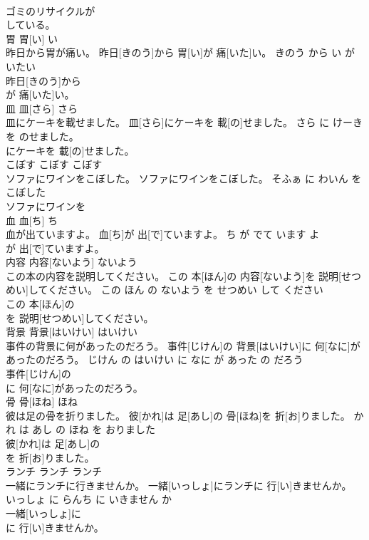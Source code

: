 \documentclass[8pt]{extreport}
\begin{document}
\begin{CJK}{UTF8}{min}
\\	ゴミのリサイクルが
\\	している。		
\\	胃	胃[い]	い	
\\	昨日から胃が痛い。	昨日[きのう]から 胃[い]が 痛[いた]い。	きのう から い が いたい	
\\	昨日[きのう]から
\\	が 痛[いた]い。		
\\	皿	皿[さら]	さら	
\\	皿にケーキを載せました。	皿[さら]にケーキを 載[の]せました。	さら に けーき を のせました。	
\\	にケーキを 載[の]せました。		
\\	こぼす	こぼす	こぼす	
\\	ソファにワインをこぼした。	ソファにワインをこぼした。	そふぁ に わいん を こぼした	
\\	ソファにワインを
\\	血	血[ち]	ち	
\\	血が出ていますよ。	血[ち]が 出[で]ていますよ。	ち が でて います よ	
\\	が 出[で]ていますよ。		
\\	内容	内容[ないよう]	ないよう	
\\	この本の内容を説明してください。	この 本[ほん]の 内容[ないよう]を 説明[せつめい]してください。	この ほん の ないよう を せつめい して ください	
\\	この 本[ほん]の
\\	を 説明[せつめい]してください。		
\\	背景	背景[はいけい]	はいけい	
\\	事件の背景に何があったのだろう。	事件[じけん]の 背景[はいけい]に 何[なに]があったのだろう。	じけん の はいけい に なに が あった の だろう	
\\	事件[じけん]の
\\	に 何[なに]があったのだろう。		
\\	骨	骨[ほね]	ほね	
\\	彼は足の骨を折りました。	彼[かれ]は 足[あし]の 骨[ほね]を 折[お]りました。	かれ は あし の ほね を おりました	
\\	彼[かれ]は 足[あし]の
\\	を 折[お]りました。		
\\	ランチ	ランチ	ランチ	
\\	一緒にランチに行きませんか。	一緒[いっしょ]にランチに 行[い]きませんか。	いっしょ に らんち に いきません か	
\\	一緒[いっしょ]に
\\	に 行[い]きませんか。		

\end{CJK}
\end{document}

